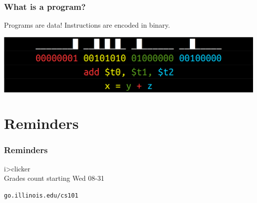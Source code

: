 \documentclass[11pt]{beamer}
\begin{document}
\begin{frame}
  \frametitle{What is a program?}
  \Enlarge

  \begin{itemize} %
    \myitem Programs are data! %
	\myitem Instructions are encoded in binary.
  \end{itemize}
  \includegraphics[width=\textwidth]{./img/assembler-4.png}
\end{frame}

\section{Reminders}

\begin{frame}
  \frametitle{Reminders}
  \Enlarge

  \begin{itemize}
  \myitem i>clicker \\ \textcolor{CS101GradBot}{\footnotesize\hspace{1em} Grades count starting Wed 08-31}
  \end{itemize}
  \begin{center}
    \textcolor{CS101Base}{\Huge \texttt{go.illinois.edu/cs101}}
  \end{center}
\end{frame}
\end{document}
